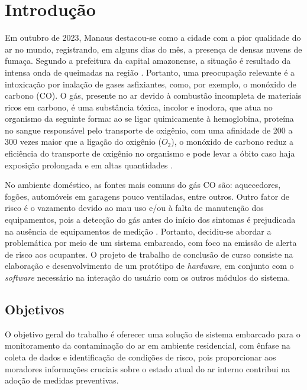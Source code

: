 \chapter{Introdução}

Em outubro de 2023, Manaus destacou-se como a cidade com a pior qualidade do ar no mundo, registrando, em alguns dias do mês, a presença 
de densas nuvens de fumaça. Segundo a prefeitura da capital amazonense, a situação é resultado da 
intensa onda de queimadas na região \cite{G1-ar-manaus}. Portanto, uma preocupação relevante 
é a intoxicação por inalação de gases asfixiantes, como, por exemplo, o monóxido de carbono (CO). O gás, presente no ar devido à combustão 
incompleta de materiais ricos em carbono, é uma substância tóxica, incolor e inodora, que atua no organismo da 
seguinte forma: ao se ligar quimicamente à hemoglobina, proteína no sangue responsável pelo transporte de oxigênio, com uma afinidade de 
200 a 300 vezes maior que a ligação do oxigênio ($O_{2}$), o monóxido de carbono reduz a eficiência do transporte de oxigênio no organismo e 
pode levar a óbito caso haja exposição prolongada e em altas quantidades \cite{carbon-monoxide-poisoning-varon}.

No ambiente doméstico, as fontes mais comuns do gás CO são: aquecedores, fogões, automóveis 
em garagens pouco ventiladas, entre outros. Outro fator de risco é o vazamento devido ao mau 
uso e/ou à falta de manutenção dos equipamentos, pois a detecção do gás antes do início dos 
sintomas é prejudicada na ausência de equipamentos de medição \cite{bio-sufocantes-hernandez2022}. Portanto, 
decidiu-se abordar a problemática por meio de um sistema embarcado, com foco na emissão de 
alerta de risco aos ocupantes. O projeto de trabalho de conclusão de curso consiste na elaboração e 
desenvolvimento de um protótipo de \textit{hardware}, em conjunto com o \textit{software} necessário na 
interação do usuário com os outros módulos do sistema. 

\section{Objetivos}

O objetivo geral do trabalho é oferecer uma solução de sistema embarcado para o monitoramento da contaminação do ar em ambiente residencial, com 
ênfase na coleta de dados e identificação de condições de risco, pois proporcionar aos moradores informações cruciais sobre o estado atual do ar interno 
contribui na adoção de medidas preventivas.

